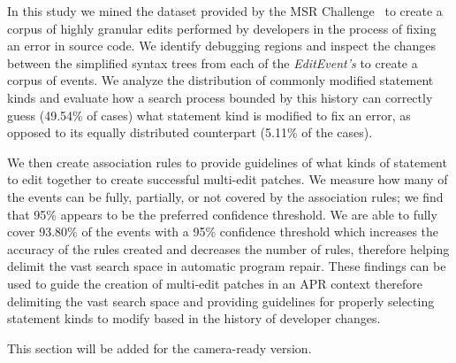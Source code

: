 \documentclass[sigconf]{acmart}
\begin{document}
In this study we mined the dataset provided by the MSR Challenge~\cite{msr18challenge}
to create a corpus of highly granular edits performed by developers in the process
of fixing an error in source code. We identify debugging
regions and inspect the changes between the simplified 
syntax trees from each
of the \textit{EditEvent's} to create a corpus of 
events.
We analyze the distribution of commonly modified statement kinds and evaluate
how a search process bounded by this history can correctly guess (49.54\% of 
cases) what statement kind is modified to fix an error, as opposed to its
equally distributed counterpart (5.11\% of the cases).

We then create association rules to provide guidelines of what kinds of
statement to edit together to create successful multi-edit patches. 
We measure how many of the events
can be fully, partially, or not covered by the association rules; we find that
95\% appears to be the preferred confidence threshold.
We are able to fully cover 93.80\% of the events with a 95\% confidence threshold
which increases the accuracy of the rules created and decreases the 
number of rules, therefore helping delimit the vast search space 
in automatic program repair. These findings can be used to guide the 
creation of multi-edit patches in an APR context therefore delimiting
the vast search space and providing guidelines for properly selecting
statement kinds to modify based in the history of developer changes.




\begin{acks}
 This section will be added for the camera-ready version.

\end{acks}




\end{document}
